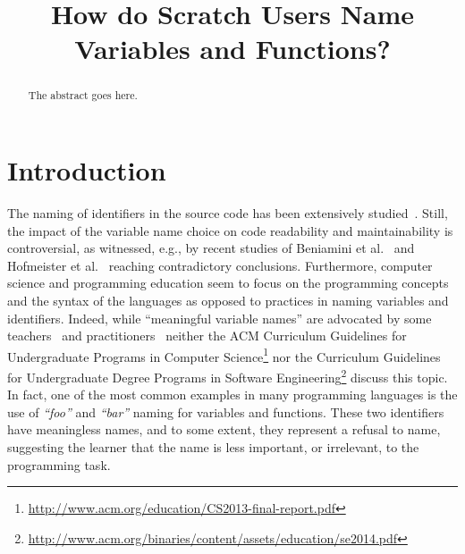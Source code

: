 \documentclass[conference]{IEEEtran}
\newcommand{\todo}[1]{ \textbf{#1} }
\newcommand{\quotes}[1]{\textit{``#1''}}
\begin{document}
\title{How do Scratch Users Name Variables and Functions? }

\author{
\and
{}
}
\maketitle

\begin{abstract}
The abstract goes here.
\end{abstract}

\IEEEpeerreviewmaketitle



\section{Introduction}
The naming of identifiers in the source code has been extensively studied~\cite{AmanASK15,AnquetilL98,AvidanF17,Beniamini,ButlerWYS10,CaprileT00,HofmeisterSH17,LawrieMFB07,LunguK13,ScannielloR13,TakangGM96,TramontanaRS14}.
Still, the impact of the variable name choice on code readability and maintainability is controversial, as witnessed, e.g., by recent studies of Beniamini et al.~\cite{Beniamini} and Hofmeister et al.~\cite{HofmeisterSH17} reaching contradictory conclusions.
%
Furthermore, computer science and programming education seem to focus on the programming concepts and the syntax of the languages as opposed to practices in naming variables and identifiers. 
Indeed, while ``meaningful variable names'' are advocated by some teachers~\cite{Kato2016} and practitioners~\cite{Rother} neither the ACM Curriculum Guidelines for Undergraduate Programs in Computer Science\footnote{\url{http://www.acm.org/education/CS2013-final-report.pdf}} nor the Curriculum Guidelines for Undergraduate Degree Programs in Software Engineering\footnote{\url{http://www.acm.org/binaries/content/assets/education/se2014.pdf}} discuss this topic.
In fact, one of the most common examples in many programming languages is the use of \quotes{foo} and \quotes{bar} naming for variables and functions. 
These two identifiers have meaningless names, and to some extent, they represent a refusal to name, suggesting the learner that the name is less important, or irrelevant, to the programming task. 
\end{document}
